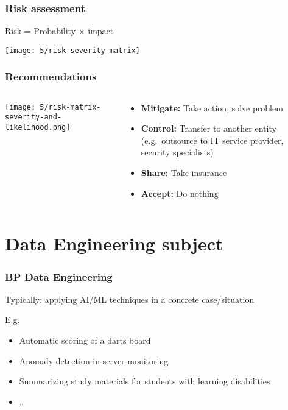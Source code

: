 \documentclass[aspectratio=169]{beamer}
\begin{document}
\begin{frame}
  \frametitle{Risk assessment}

  \centering

  Risk = Probability $\times$ impact

  \texttt{[image: 5/risk-severity-matrix]}

\end{frame}

\begin{frame}
  \frametitle{Recommendations}

  \begin{columns}
    \begin{column}{.5\textwidth}
      \texttt{[image: 5/risk-matrix-severity-and-likelihood.png]}
    \end{column}

    \begin{column}{.5\textwidth}
      \begin{itemize}
        \item \textbf{Mitigate:} Take action, solve problem
        \item \textbf{Control:} Transfer to another entity (e.g.\ outsource to IT service provider, security specialists)
        \item \textbf{Share:} Take insurance
        \item \textbf{Accept:} Do nothing
      \end{itemize}
    \end{column}
  \end{columns}
\end{frame}

\section{Data Engineering subject}

\begin{frame}
  \frametitle{BP Data Engineering}

  Typically: applying AI/ML techniques in a concrete case/situation

  E.g.

  \begin{itemize}
    \item Automatic scoring of a darts board
    \item Anomaly detection in server monitoring
    \item Summarizing study materials for students with learning disabilities
    \item \ldots
  \end{itemize}

\end{frame}
\end{document}
